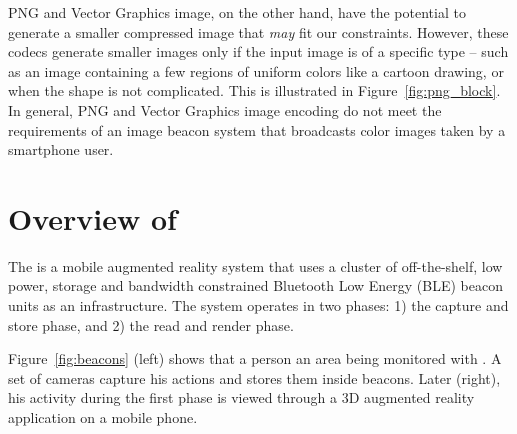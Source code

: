 
PNG and Vector Graphics image, on the other hand, have the potential to generate a smaller compressed image that \textit{may} fit our constraints. However, these codecs generate smaller images only if the input image is of a specific type -- such as an image containing a few regions of uniform colors like a cartoon drawing, or when the shape is not complicated. This is illustrated in Figure~\ref{fig:png_block}. In general, PNG and Vector Graphics image encoding do not meet the requirements of an image beacon system that broadcasts color images taken by a smartphone user.


\section{Overview of \Sys}
\label{sec:system}


The \Sys is a mobile augmented reality system that uses a cluster of off-the-shelf, low power, storage and bandwidth constrained Bluetooth Low Energy (BLE) beacon units as an infrastructure. The system operates in two phases: 1) the capture and store phase, and 2) the read and render phase.

Figure~\ref{fig:beacons} (left) shows that a person  an area being monitored with \Sys. A set of cameras capture his actions and stores them inside beacons. Later (right), his activity during the first phase is viewed through a 3D augmented reality application on a mobile phone. 

